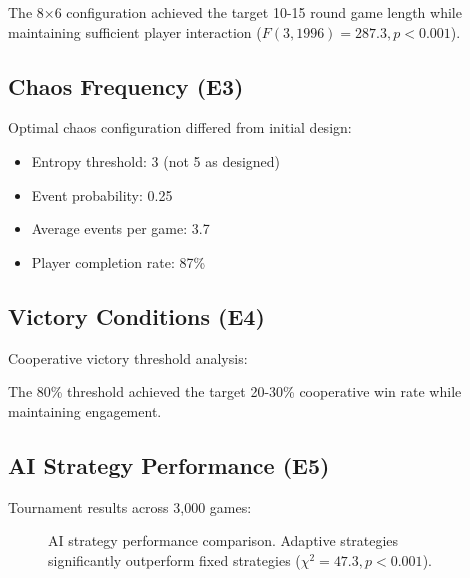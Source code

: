 \documentclass[sigconf]{acmart}
\begin{document}
The 8×6 configuration achieved the target 10-15 round game length while maintaining sufficient player interaction ($F(3,1996) = 287.3, p < 0.001$).

\subsection{Chaos Frequency (E3)}

Optimal chaos configuration differed from initial design:

\begin{itemize}
\item Entropy threshold: 3 (not 5 as designed)
\item Event probability: 0.25
\item Average events per game: 3.7
\item Player completion rate: 87\%
\end{itemize}

\subsection{Victory Conditions (E4)}

Cooperative victory threshold analysis:



The 80\% threshold achieved the target 20-30\% cooperative win rate while maintaining engagement.

\subsection{AI Strategy Performance (E5)}

Tournament results across 3,000 games:

\begin{figure}[h]
\centering
{}
\caption{AI strategy performance comparison. Adaptive strategies significantly outperform fixed strategies ($\chi^2 = 47.3, p < 0.001$).}
\label{fig:strategies}
\end{figure}
\end{document}
